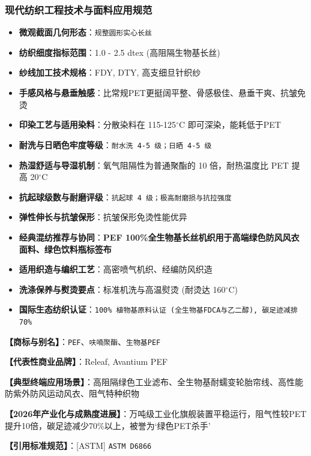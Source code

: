 \documentclass[11pt,openright,twoside,UTF8]{ctexbook}
\begin{document}
\subsubsection*{现代纺织工程技术与面料应用规范}
\begin{itemize} \setlength{\itemsep}{2pt}
    \item \textbf{微观截面几何形态}：\texttt{规整圆形实心长丝}
    \item \textbf{纺织细度指标范围}：1.0 - 2.5 dtex (高阻隔生物基长丝)
    \item \textbf{纱线加工技术规格}：FDY, DTY, 高支细旦针织纱
    \item \textbf{手感风格与悬垂触感}：比常规PET更挺阔平整、骨感极佳、悬垂干爽、抗皱免烫
    \item \textbf{印染工艺与适用染料}：分散染料在 115-125$^\circ\mathrm{C}$ 即可深染，能耗低于PET
    \item \textbf{耐洗与日晒色牢度等级}：\texttt{耐水洗 4-5 级；日晒 4-5 级}
    \item \textbf{热湿舒适与导湿机制}：氧气阻隔性为普通聚酯的 10 倍，耐热温度比 PET 提高 20$^\circ\mathrm{C}$
    \item \textbf{抗起球级数与耐磨评级}：\texttt{抗起球 4 级；极高耐磨损与抗拉强度}
    \item \textbf{弹性伸长与抗皱保形}：抗皱保形免烫性能优异
    \item \textbf{经典混纺推荐与协同}：\textbf{PEF 100\%全生物基长丝机织用于高端绿色防风风衣面料、绿色饮料瓶标签布}
    \item \textbf{适用织造与编织工艺}：高密喷气机织、经编防风织造
    \item \textbf{洗涤保养与熨烫要点}：标准机洗与高温熨烫 (耐烫达 160$^\circ\mathrm{C}$)
    \item \textbf{国际生态纺织认证}：\texttt{100\% 植物基原料认证 (全生物基FDCA与乙二醇), 碳足迹减排70\%}
\end{itemize}
\vspace{0.2cm}

\noindent\textbf{【商标与别名】}：\texttt{PEF}、\texttt{呋喃聚酯}、\texttt{生物基PEF}\par
\noindent\textbf{【代表性商业品牌】}：Releaf, Avantium PEF\par
\noindent\textbf{【典型终端应用场景】}：高阻隔绿色工业滤布、全生物基耐蠕变轮胎帘线、高性能防紫外防风运动风衣、阻气特种织物\par
\noindent\textbf{【2026年产业化与成熟度进展】}：万吨级工业化旗舰装置平稳运行，阻气性较PET提升10倍，碳足迹减少70\%以上，被誉为‘绿色PET杀手’\par
\noindent\textbf{【引用标准规范】}：[ASTM] \texttt{ASTM D6866}\par
\vspace{0.5cm}
\end{document}
